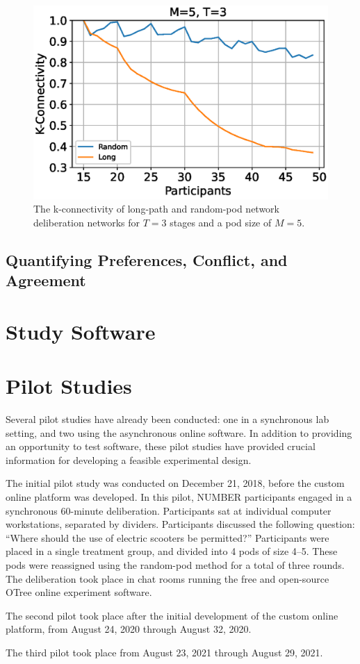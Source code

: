 \begin{figure}
\label{fig:kcon}
\includegraphics[width=5in]{fig/Experiment/fig-kcon.eps}
\caption{The k-connectivity of long-path and random-pod network deliberation
networks for $T=3$ stages and a pod size of $M=5$.}
\end{figure}

\subsection{Quantifying Preferences, Conflict, and Agreement}

\section{Study Software}

\section{Pilot Studies}
Several pilot studies have already been conducted:
one in a synchronous lab setting, and two using the asynchronous online
software.
In addition to providing an opportunity to test software,
these pilot studies have provided crucial information for developing a
feasible experimental design.

The initial pilot study was conducted on December 21, 2018,
before the custom online platform was developed.
In this pilot, NUMBER participants engaged in a synchronous 60-minute deliberation.
Participants sat at individual computer workstations, separated by dividers.
Participants discussed the following question:
``Where should the use of electric scooters be permitted?''
Participants were placed in a single treatment group, and divided into 4
pods of size 4--5.
These pods were reassigned using the random-pod method for a total of three
rounds.
The deliberation took place in chat rooms running the free and open-source
OTree online experiment software.

The second pilot took place after the initial development of the custom online
platform, from August 24, 2020 through August 32, 2020.

The third pilot took place from August 23, 2021 through August 29, 2021.

